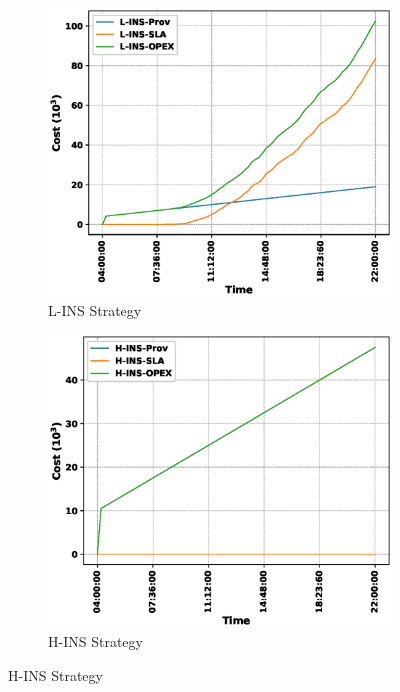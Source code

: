 \documentclass[conference, final]{IEEEtran}
\begin{document}
{\begin{figure}
\begin{subfigure}[h]{0.32\linewidth}
\includegraphics[width=\linewidth]{./figures/L-INScost_trace.eps}
\caption{{\textsf{L-INS}} Strategy}
\end{subfigure}
\hfill
\begin{subfigure}[h]{0.32\linewidth}
\includegraphics[width=\linewidth]{./figures/H-INScost_trace.eps}
\caption{{\textsf{H-INS}} Strategy}
\end{subfigure}

\end{figure}}
\end{document}
